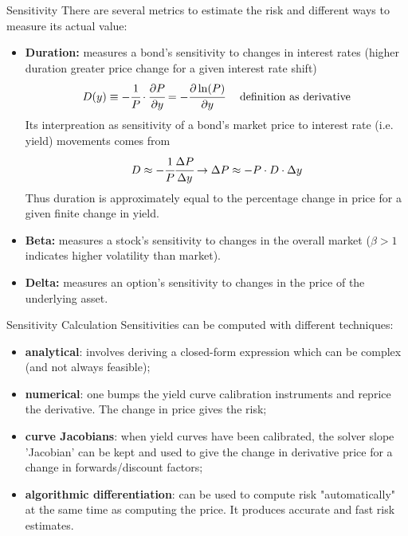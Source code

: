 \documentclass{beamer}
\begin{document}
\begin{frame}{Sensitivity}
There are several metrics to estimate the risk and different ways to measure its actual value:
\begin{itemize}
\item \textbf{Duration:} measures a bond's sensitivity to changes in interest rates (higher duration greater price change for a given interest rate shift)
\begin{equation*}
D(y)\equiv -\cfrac{1}{P}\cdot \cfrac{\partial P}{\partial y}=-\cfrac {\partial \ln(P)}{\partial y}\quad\text{ definition as derivative}
\end{equation*}
Its interpreation as sensitivity of a bond's market price to interest rate (i.e. yield) movements comes from
\begin{equation*}
D\approx -\cfrac {1}{P}\cfrac{\Delta P}{\Delta y}\rightarrow \Delta P\approx -P\cdot D\cdot \Delta y
\end{equation*}
Thus duration is approximately equal to the percentage change in price for a given finite change in yield.
\item \textbf{Beta:} measures a stock's sensitivity to changes in the overall market ($\beta > 1$ indicates higher volatility than market).
\item \textbf{Delta:} measures an option's sensitivity to changes in the price of the underlying asset.
\end{itemize}
\end{frame}

\begin{frame}{Sensitivity Calculation}
Sensitivities can be computed with different techniques:
\begin{itemize}
	\item \textbf{analytical}: involves deriving a closed-form expression which can be complex (and not always feasible);
	\item \textbf{numerical}: one bumps the yield curve calibration instruments and reprice the derivative. The change in price gives the risk;
	\item \textbf{curve Jacobians}: when yield curves have been calibrated, the solver slope 'Jacobian' can be kept and used to give the change in derivative price for a change in forwards/discount factors;
	\item \textbf{algorithmic differentiation}: can be used to compute risk "automatically" at the same time as computing the price. It produces accurate and fast risk estimates.
\end{itemize}
\end{frame}
\end{document}
